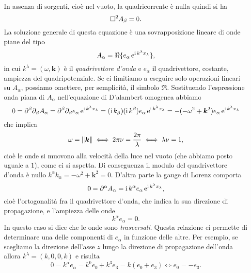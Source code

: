 In assenza di sorgenti, cioè nel vuoto, la quadricorrente è nulla quindi si ha
\begin{equation}
  \label{eq:maxwell-vuoto-lorenz}
  \Box^{2} A_{\beta} = 0.
\end{equation}
La soluzione generale di questa equazione è una sovrapposizione lineare di onde
piane del tipo
\begin{equation}
  A_{\alpha} = \Re \{e_{\alpha} \operatorname{\mathrm{e}}^{\operatorname{\mathrm{i}} k^{\lambda} x_{\lambda}}\},
\end{equation}
in cui $k^{\lambda} = (\omega, \bm{k})$ è il
\emph{quadrivettore d'onda} e $e_{\alpha}$ il
quadrivettore, costante, ampiezza del quadripotenziale.  Se ci limitiamo a
eseguire solo operazioni lineari su $A_{\alpha}$, possiamo omettere, per
semplicità, il simbolo $\Re$.  Sostituendo l'espressione onda piana di
$A_{\alpha}$ nell'equazione di D'alambert omogenea abbiamo
\begin{equation}
  0 = \partial^{\beta}\partial_{\beta} A_{\alpha} = \partial^{\beta}\partial_{\beta}
  e_{\alpha} \operatorname{\mathrm{e}}^{\operatorname{\mathrm{i}} k^{\lambda} x_{\lambda}} = (\operatorname{\mathrm{i}} k_{\beta})(\operatorname{\mathrm{i}}
  k^{\beta}) e_{\alpha} \operatorname{\mathrm{e}}^{\operatorname{\mathrm{i}} k^{\lambda} x_{\lambda}} = -(-\omega^{2} +
  \bm{k}^{2}) e_{\alpha} \operatorname{\mathrm{e}}^{\operatorname{\mathrm{i}} k^{\lambda} x_{\lambda}}
\end{equation}
che implica
\begin{equation}
  \omega = \lVert\bm{k}\rVert \iff 2\pi\nu = \frac{2\pi}{\lambda} \iff \lambda\nu=1,
\end{equation}
cioè le onde si muovono alla velocità della luce nel vuoto (che abbiamo posto
uguale a $1$), come ci si aspetta.  Di conseguenza il modulo del quadrivettore
d'onda è nullo $k^{\alpha}k_{\alpha} = -\omega^{2} + \bm{k}^{2} = 0$.  D'altra
parte la gauge di Lorenz comporta
\begin{equation}
  0 = \partial^{\alpha} A_{\alpha} = \operatorname{\mathrm{i}} k^{\alpha} e_{\alpha} \operatorname{\mathrm{e}}^{\operatorname{\mathrm{i}}
    k^{\lambda}x_{\lambda}},
\end{equation}
cioè l'ortogonalità fra il quadrivettore d'onda, che indica la sua direzione di
propagazione, e l'ampiezza delle onde
\begin{equation}
  k^{\alpha} e_{\alpha} = 0.
\end{equation}
In questo caso si dice che le onde sono \emph{trasversali}.  Questa relazione ci
permette di determinare una delle componenti di $e_{\alpha}$ in funzione delle
altre.  Per esempio, se scegliamo la direzione dell'asse $z$ lungo la direzione
di propagazione dell'onda allora $k^{\lambda} = (k, 0, 0, k)$ e risulta
\begin{equation}
  0 = k^{\alpha} e_{\alpha} = k^{0}e_{0} + k^{3}e_{3} = k(e_{0} + e_{3}) \iff
  e_{0} = -e_{3}.
\end{equation}
